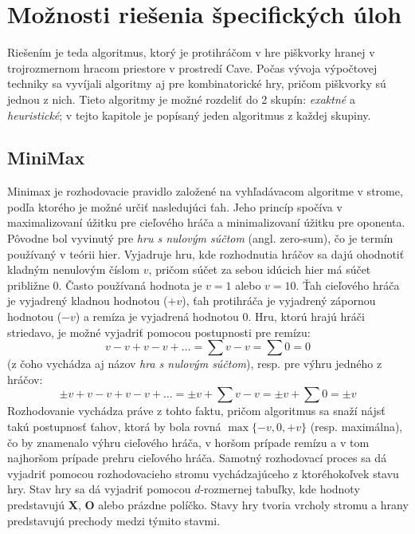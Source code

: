 \section{Možnosti riešenia špecifických úloh}\label{sec:algorithms}
Riešením je teda algoritmus, ktorý je protihráčom v hre piškvorky hranej v trojrozmernom hracom priestore v prostredí
Cave.
Počas vývoja výpočtovej techniky sa vyvíjali algoritmy aj pre kombinatorické hry, pričom piškvorky sú jednou z nich.
Tieto algoritmy je možné rozdeliť do 2 skupín: \emph{exaktné} a \emph{heuristické}; v tejto kapitole je popísaný jeden
algoritmus z každej skupiny.

\subsection{MiniMax}\label{subsec:algo-minmax}

Minimax je rozhodovacie pravidlo založené na vyhľadávacom algoritme v strome, podľa ktorého je možné určiť nasledujúci
ťah.\cite{algo_minimax}
Jeho princíp spočíva v maximalizovaní úžitku pre cieľového hráča a minimalizovaní úžitku pre oponenta.
Pôvodne bol vyvinutý pre \emph{hru s nulovým súčtom} (angl. zero-sum), čo je termín používaný v teórii hier.
Vyjadruje hru, kde rozhodnutia hráčov sa dajú ohodnotiť kladným nenulovým číslom $v$, pričom súčet za sebou idúcich hier
má súčet približne 0.
Často používaná hodnota je $v=1$ alebo $v=10$.
Ťah cieľového hráča je vyjadrený kladnou hodnotou ($+v$), ťah protihráča je vyjadrený zápornou hodnotou ($-v$) a remíza
je vyjadrená hodnotou $0$.
Hru, ktorú hrajú hráči striedavo, je možné vyjadriť pomocou postupnosti pre remízu:
\begin{equation}
    v-v+v-v+ \dots = \sum{v-v} = \sum{0} = 0
\end{equation}
(z čoho vychádza aj názov \emph{hra s nulovým súčtom}), resp. pre výhru jedného z hráčov:
\begin{equation}
    \pm v+v-v+v-v+ \dots = \pm v+\sum{v-v} = \pm v+\sum{0} = \pm v
\end{equation}
Rozhodovanie vychádza práve z tohto faktu, pričom algoritmus sa snaží nájsť takú postupnosť ťahov, ktorá by bola rovná
$\max\{-v, 0, +v\}$ (resp. maximálna), čo by znamenalo výhru cieľového hráča, v horšom prípade remízu a v tom najhoršom
prípade prehru cieľového hráča.
Samotný rozhodovací proces sa dá vyjadriť pomocou rozhodovacieho stromu vychádzajúceho z ktoréhokoľvek stavu hry.
Stav hry sa dá vyjadriť pomocou $d$-rozmernej tabuľky, kde hodnoty predstavujú \textbf{X}, \textbf{O} alebo prázdne
políčko.
Stavy hry tvoria vrcholy stromu a hrany predstavujú prechody medzi týmito stavmi.

